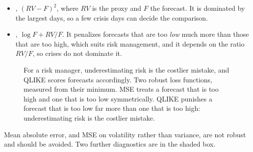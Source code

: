 \begin{itemize}
  \item {}, $(RV - F)^2$, where $RV$ is the proxy and $F$ the forecast. It is dominated by the largest days, so a few crisis days can decide the comparison.
  \item {}, $\log F + RV/F$. It penalizes forecasts that are too \emph{low} much more than those that are too high, which suits risk management, and it depends on the ratio $RV/F$, so crises do not dominate it.
\end{itemize}

\begin{figure}[htbp]
\centering
{}
\caption{For a risk manager, underestimating risk is the costlier mistake, and QLIKE scores forecasts accordingly. Two robust loss functions, measured from their minimum. MSE treats a forecast that is too high and one that is too low symmetrically. QLIKE punishes a forecast that is too low far more than one that is too high: underestimating risk is the costlier mistake.}
\label{fig:10-qlike}
\end{figure}

Mean absolute error, and MSE on volatility rather than variance, are not robust and should be avoided. Two further diagnostics are in the shaded box.

